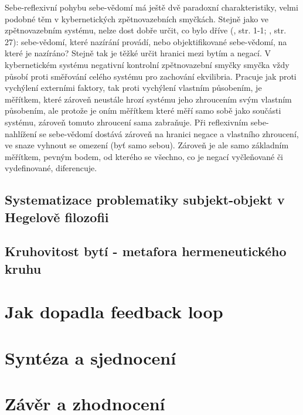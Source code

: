 \documentclass[11pt,a4paper]{article}
\begin{document}
Sebe-reflexivní pohybu sebe-vědomí má ještě dvě paradoxní charakteristiky, velmi podobné těm v kybernetických zpětnovazebních smyčkách. Stejně jako ve zpětnovazebním systému, nelze dost dobře určit, co bylo dříve (\cite{astrom_feedback_2021}, str. 1-1; \cite{kainz_paradox_1988}, str. 27): sebe-vědomí, které nazírání provádí, nebo objektifikované sebe-vědomí, na které je nazíráno? Stejně tak je těžké určit hranici mezi bytím a negací. V kybernetickém systému negativní kontrolní zpětnovazební smyčky smyčka vždy působí proti směřování celého systému pro zachování ekvilibria. Pracuje jak proti vychýlení externími faktory, tak proti vychýlení vlastním působením, je měřítkem, které zároveň neustále hrozí systému jeho zhroucením svým vlastním působením, ale protože je oním měřítkem které měří samo sobě jako součásti systému, zároveň tomuto zhroucení sama zabraňuje. Při reflexivním sebe-nahlížení se sebe-vědomí dostává zároveň na hranici negace a vlastního zhroucení, ve snaze vyhnout se omezení (byť samo sebou). Zároveň je ale samo základním měřítkem, pevným bodem, od kterého se všechno, co je negací vyčleňované či vydefinované, diferencuje. 





\subsection{Systematizace problematiky subjekt-objekt v Hegelově filozofii}



\subsection{Kruhovitost bytí - metafora hermeneutického kruhu}





\section{Jak dopadla feedback loop}





\section{Syntéza a sjednocení}





\section{Závěr a zhodnocení}


\newpage

\printbibliography[heading=bibintoc, title={Bibliografie}]
\end{document}
